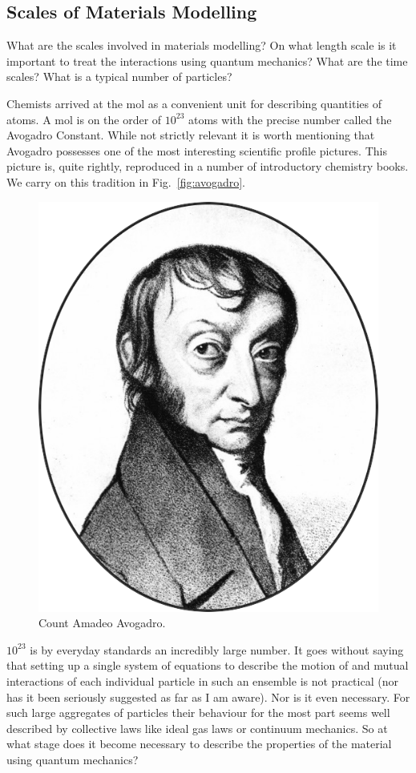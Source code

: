 \subsection{Scales of Materials Modelling}
What are the scales involved in materials modelling?
On what length scale is it important to treat the interactions
using quantum mechanics? What are the time scales? 
What is a typical number of particles?

Chemists arrived at the mol as a convenient unit for describing
quantities of atoms. A mol is on the order of $10^{23}$ atoms with
the precise number called the Avogadro Constant. While not strictly relevant
it is worth mentioning that Avogadro possesses one of the most
interesting scientific profile pictures. This picture is, quite rightly, reproduced
in a number of introductory chemistry books. We carry on this tradition 
in Fig.~\ref{fig:avogadro}.
%
\begin{figure}
\begin{center}
\includegraphics[scale=0.4]{./intro/Amadeo_Avogadro.png}
\end{center}
\caption{Count Amadeo Avogadro.}
\end{figure}
%
$10^{23}$ is by everyday standards an incredibly large number. 
It goes without saying that setting up a single system of 
equations to describe the motion of and mutual 
interactions of each individual particle in such an ensemble is not practical 
(nor has it been seriously suggested as far as I am aware). Nor is it even necessary.
For such large aggregates of particles their behaviour for the most part seems 
well described by collective laws like ideal gas laws or continuum mechanics. 
So at what stage does it become necessary to describe the properties of the material
using quantum mechanics? 

